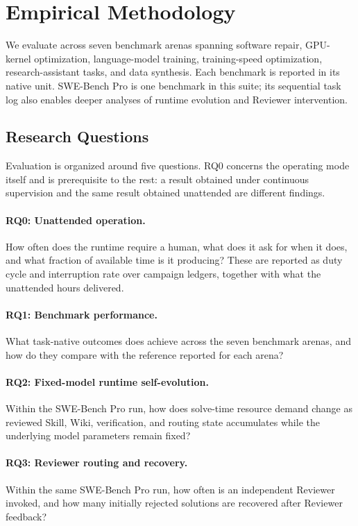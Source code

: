\section{Empirical Methodology}
\label{sec:methodology}

We evaluate \systemname across seven benchmark arenas spanning software repair,
GPU-kernel optimization, language-model training, training-speed optimization,
research-assistant tasks, and data synthesis. Each benchmark is reported in its
native unit. SWE-Bench Pro is one benchmark in this suite; its sequential task log
also enables deeper analyses of runtime evolution and Reviewer intervention.

\subsection{Research Questions}

Evaluation is organized around five questions. RQ0 concerns the operating mode
itself and is prerequisite to the rest: a result obtained under continuous
supervision and the same result obtained unattended are different findings.

\paragraph{RQ0: Unattended operation.}
How often does the runtime require a human, what does it ask for when it does, and
what fraction of available time is it producing? These are reported as duty cycle and
interruption rate over campaign ledgers, together with what the unattended hours
delivered.

\paragraph{RQ1: Benchmark performance.}
What task-native outcomes does \systemname achieve across the seven benchmark
arenas, and how do they compare with the reference reported for each arena?

\paragraph{RQ2: Fixed-model runtime self-evolution.}
Within the SWE-Bench Pro run, how does solve-time resource demand change as reviewed
Skill, Wiki, verification, and routing state accumulates while the underlying model
parameters remain fixed?

\paragraph{RQ3: Reviewer routing and recovery.}
Within the same SWE-Bench Pro run, how often is an independent Reviewer invoked,
and how many initially rejected solutions are recovered after Reviewer feedback?

